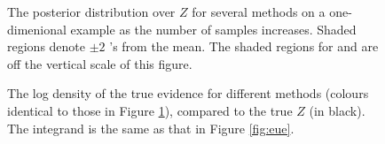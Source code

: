 \documentclass{article}
\begin{document}
% 
% 
% 
% 

\begin{figure}
	\caption{The posterior distribution over $Z$ for several methods on a one-dimenional example as the number of samples increases.  Shaded regions denote $\pm2$ 's from the mean.  The shaded regions for  and  are off the vertical scale of this figure.}
\label{fig:se}
\end{figure}

\begin{figure}
	\centering
	\caption{The log density of the true evidence for different methods (colours identical to those in Figure \ref{fig:se}), compared to the true $Z$ (in black).  The integrand is the same as that in Figure \ref{fig:eue}.}
\label{fig:nll}
\end{figure}




\end{document}
